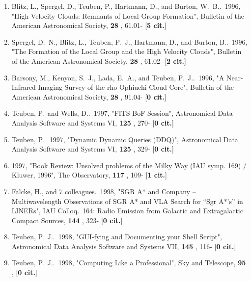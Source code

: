 \documentclass[11pt,letterpaper]{article}
\begin{document}
\begin{enumerate}[resume,label=\textbf{\arabic*}.]
\item  
Blitz, L., Spergel, D., Teuben, P., Hartmann, D., and Burton, W.~B..\  
1996,  "High Velocity Clouds: Remnants of Local Group Formation", Bulletin 
of the American Astronomical Society,  {\bf 28} , 61.01- [{\bf 5 cit.}] 

\item  
Spergel, D.~N., Blitz, L., Teuben, P.~J., Hartmann, D., and Burton, B..\  
1996,  "The Formation of the Local Group and the High Velocity Clouds", 
Bulletin of the American Astronomical Society,  {\bf 28} , 61.02- [{\bf 2 
cit.}] 

\item  
Barsony, M., Kenyon, S.~J., Lada, E.~A., and Teuben, P.~J..\  1996,  "A 
Near-Infrared Imaging Survey of the rho Ophiuchi Cloud Core", Bulletin of 
the American Astronomical Society,  {\bf 28} , 91.04- [{\bf 0 cit.}] 

\item  
Teuben, P.~and Wells, D..\  1997,  "FITS BoF Session", Astronomical Data 
Analysis Software and Systems VI,  {\bf 125} , 270- [{\bf 0 cit.}] 

\item  
Teuben, P..\  1997,  "Dynamic Dynamic Queries (DDQ)", Astronomical Data 
Analysis Software and Systems VI,  {\bf 125} , 329- [{\bf 0 cit.}] 

\item  
 1997,  "Book Review: Unsolved problems of the Milky Way (IAU symp. 169) / 
Kluwer, 1996", The Observatory,  {\bf 117} , 109- [{\bf 1 cit.}] 

\item  
Falcke, H., and 7 colleagues.\  1998,  "SGR A* and Company -- 
Multiwavelength Observations of SGR A* and VLA Search for ``Sgr A*'s'' in 
LINERs", IAU Colloq.~164: Radio Emission from Galactic and Extragalactic 
Compact Sources,  {\bf 144} , 323- [{\bf 0 cit.}] 

\item  
Teuben, P.~J..\  1998,  "GUI-fying and Documenting your Shell Script", 
Astronomical Data Analysis Software and Systems VII,  {\bf 145} , 116- 
[{\bf 0 cit.}] 

\item  
Teuben, P.~J..\  1998,  "Computing Like a Professional", Sky and Telescope,  
{\bf 95} ,  [{\bf 0 cit.}] 


\end{enumerate}
\end{document}
